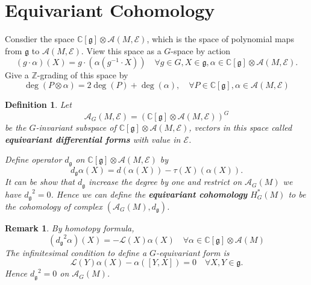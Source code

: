 \documentclass[12pt]{amsart}
\newtheorem{Def}[Thm]{Definition}
\newtheorem{Rmk}[Thm]{Remark}
\def\cA{{\mathcal{A}}}
\def\cAg{{\mathcal{A}_G}}
\def\cL{{\mathcal{L}}}
\def\cE{{\mathcal{E}}}
\def\bC{{\mathbb{C}}}
\def\bZ{{\mathbb{Z}}}
\def\fgg{{\mathfrak{g}}}
\def\bZ{{\mathbb{Z}}}
\def\dg{{d_{\fgg}}}
\def\kw#1{{\bf \em #1}}
\begin{document}
\section{Equivariant Cohomology}

Consdier the space $\bC[\fgg]\otimes \cA(M,\cE)$, which is the space of polynomial maps from $\fgg$ to $\cA(M,\cE)$. View this space as a $G$-space by action
\[
(g\cdot \alpha)(X) = g\cdot (\alpha (g^{-1}\cdot X)) \quad \forall g\in G,
X \in \fgg, \alpha \in \bC[\fgg]\otimes \cA(M,\cE).
\]
Give a $\bZ$-grading of this space by 
\[
\deg(P\otimes \alpha) = 2\deg(P)+\deg(\alpha), 
\quad \forall P\in \bC[\fgg], \alpha \in \cA(M,\cE)
\]

\begin{Def}
Let 
\[
\cA_G(M,\cE) = \left(\bC[\fgg]\otimes \cA(M,\cE)\right)^G
\]
be the $G$-invariant subspace of $\bC[\fgg]\otimes \cA(M,\cE)$, vectors in this space called \kw{equivariant differential forms} with value in $\cE$.

Define operator $\dg$ on $\bC[\fgg]\otimes \cA(M,\cE)$ by
\[
\dg \alpha(X) = d(\alpha(X)) - \tau(X)(\alpha(X)).
\]
It can be show that $\dg$ increase the degree by one and restrict on 
$\cAg(M)$ we have $\dg^2= 0$. Hence we can define
the \kw{equivariant cohomology} $H_G^*(M)$ to be the cohomology of complex $\left(\cAg(M),\dg\right)$.
\end{Def}

\begin{Rmk}
By homotopy formula,
\[
(\dg^2 \alpha)(X) = - \cL(X)\alpha(X)\quad \forall \alpha
\in \bC[\fgg]\otimes \cA(M)
\]
The infinitesimal condition to define a $G$-equivariant form is 
\[
\cL(Y)\alpha(X) - \alpha([Y,X]) = 0 \quad \forall X,Y \in \fgg.
\]
Hence $\dg^2 = 0$ on $\cAg(M)$.
\end{Rmk}
\end{document}
